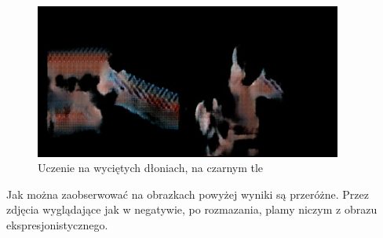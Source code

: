 \documentclass[12pt]{article}
\begin{document}
\begin{sloppypar}
{{\begin{figure}[H]
    \end{figure}
    \begin{figure}[H]
      \centering
      \includegraphics[width=0.9\textwidth]{cycle-gan/random/03f12c67-1c59-4e35-9fca-8c9332564fe9.jpg}
      \caption{Uczenie na wyciętych dłoniach, na czarnym tle}
    \end{figure}
    Jak można zaobserwować na obrazkach powyżej wyniki są przeróżne. 
    Przez zdjęcia wyglądające jak w negatywie, po rozmazania, plamy niczym z obrazu ekspresjonistycznego.
  }
}
\end{sloppypar}
\end{document}

